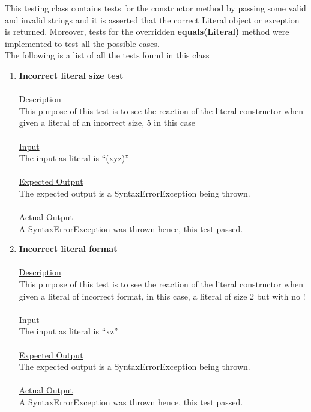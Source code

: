\documentclass{article}
\newcommand{\quotes}[1]{``#1''}
\begin{document}
	This testing class contains tests for the constructor method by passing some valid and invalid strings and it is asserted that the correct Literal object or exception is returned. Moreover, tests for the overridden \textbf{equals(Literal)} method were implemented to test all the possible cases.\\
	The following is a list of all the tests found in this class
	

	\begin{enumerate}
		\item \textbf{Incorrect literal size test}\\\\
		\underline{Description}\\
		\indent This purpose of this test is to see the reaction of the literal constructor when given a literal of an incorrect size, 5 in this case\\\\
		\underline{Input}\\
		\indent The input as literal is \quotes{(xyz)}\\	\\
		\underline{Expected Output}\\
		\indent The expected output is a SyntaxErrorException being thrown.\\\\
		\underline{Actual Output}\\
		\indent A SyntaxErrorException was thrown hence, this test passed.\\
		
		\item \textbf{Incorrect literal format}\\\\
		\underline{Description}\\
		\indent This purpose of this test is to see the reaction of the literal constructor when given a literal of incorrect format, in this case, a literal of size 2 but with no !\\\\
		\underline{Input}\\
		\indent The input as literal is \quotes{xz}\\	\\
		\underline{Expected Output}\\
		\indent The expected output is a SyntaxErrorException being thrown.\\\\
		\underline{Actual Output}\\
		\indent A SyntaxErrorException was thrown hence, this test passed.\\
		

\end{enumerate}
\end{document}
